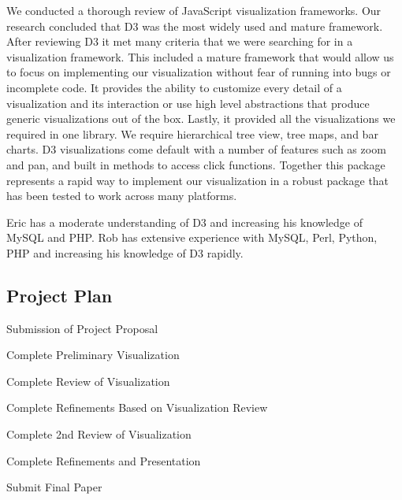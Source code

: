 \documentclass{soups}
\begin{document}
We conducted a thorough review of JavaScript visualization frameworks.  Our research concluded that D3 was the most widely used and mature framework.  After reviewing D3 it met many criteria that we were searching for in a visualization framework.  This included a mature framework that would allow us to focus on implementing our visualization without fear of running into bugs or incomplete code.  It provides the ability to customize every detail of a visualization and its interaction or use high level abstractions that produce generic visualizations out of the box.  Lastly, it provided all the visualizations we required in one library.  We require hierarchical tree view, tree maps, and bar charts.  D3 visualizations come default with a number of features such as zoom and pan, and built in methods to access click functions.  Together this package represents a rapid way to implement our visualization in a robust package that has been tested to work across many platforms.

Eric has a moderate understanding of D3 and increasing his knowledge of MySQL and PHP.  Rob has extensive experience with MySQL, Perl, Python, PHP and increasing his knowledge of D3 rapidly.

\subsection{Project Plan}
\begin{description}[leftmargin=7em, style=nextline]
\item [26 Oct 2018] Submission of Project Proposal
\item [04 Nov 2018] Complete Preliminary Visualization
\item [11 Nov 2018] Complete Review of Visualization
\item [18 Nov 2018] Complete Refinements Based on Visualization Review
\item [25 Nov 2018] Complete 2nd Review of Visualization
\item [30 Nov 2018] Complete Refinements and Presentation
\item [14 Dec 2018] Submit Final Paper
\end{description}


\printbibliography
\end{document}
